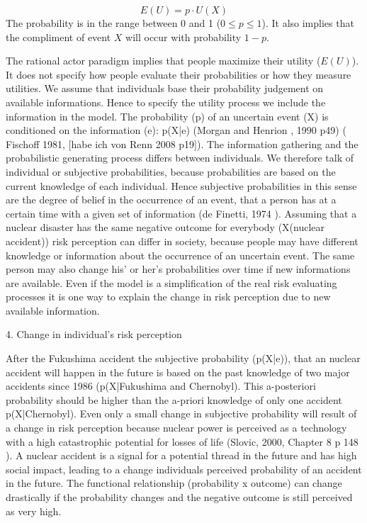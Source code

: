 \begin{equation}
   E(U) =  p \cdot U(X)  \nonumber
\end{equation}
The probability is in the range between 0 and 1 ($0 \leq p \leq 1$). It also implies that the compliment of event $X$  will occur with probability $1-p$.  

The rational actor paradigm  implies that people maximize their utility ($E(U)$). It does not specify how people evaluate their probabilities or how they measure utilities. We assume that individuals base their probability judgement on available informations. Hence to specify the utility process we include the information in the model. The probability (p) of an uncertain event (X) is conditioned on the information (e): p(X|e) (Morgan and Henrion , 1990 p49) ( Fischoff 1981, \citep{Fischhoff:1981tx} [habe ich von Renn 2008 p19]). The information gathering and the probabilistic generating process differs between individuals. We therefore talk of individual or subjective probabilities, because probabilities are based on the current knowledge of each individual. Hence subjective probabilities in this sense are the degree of belief in the occurrence of an event, that a person has at a certain time with a given set of information  (de Finetti, 1974 \citep{deFinetti:1974ua}).   
Assuming that a nuclear disaster has the same negative outcome for everybody (X(nuclear accident)) risk perception can differ in society, because people may have different knowledge or information about the occurrence of an uncertain event. The same person may also change his' or her's probabilities over time if new informations are available. Even if the model is a simplification of the real risk evaluating processes it is one way to explain the change in risk perception due to new available information. 



4. Change in individual's risk perception

After the Fukushima accident the subjective probability (p(X|e)), that an nuclear accident will happen in the future is based on the past knowledge of two major accidents since 1986 (p(X|Fukushima and Chernobyl). This a-posteriori probability should be higher than the a-priori knowledge of only one accident p(X|Chernobyl). Even only a small change in subjective probability will result of a change in risk perception because nuclear power is perceived as a technology with a high catastrophic potential for losses of life (Slovic, 2000, Chapter 8 p 148   \citep[148]{Slovic:2000tx}). A nuclear accident is a signal for a potential thread in the future and has high social impact, leading to a change individuals perceived probability of an accident in the future. The functional relationship (probability x outcome) can change drastically if the  probability changes and the negative outcome is still perceived as very high.  

